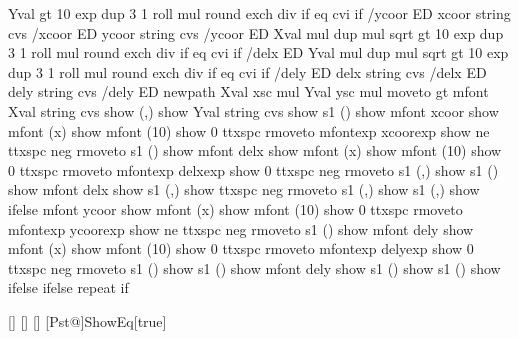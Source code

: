 {{{     Yval \psk@decimals{} gt
     { 10 \psk@decimals\space exp dup 3 1 roll mul round exch div } if
     \psk@decimals{} eq {cvi} if /ycoor ED
     xcoor \psk@valuewidth\space string cvs /xcoor ED
     ycoor \psk@valuewidth\space string cvs /ycoor ED
     \psk@relxerr\space Xval mul dup mul sqrt
     \psk@decimals{} gt
     { 10   \psk@decimals\space exp dup 3 1 roll mul round exch div } if
     \psk@decimals{} eq {cvi} if /delx ED
     \psk@relyerr\space Yval mul dup mul sqrt
     \psk@decimals{} gt
     { 10   \psk@decimals\space exp dup 3 1 roll mul round exch div } if
     \psk@decimals{} eq {cvi} if /dely ED
     delx \psk@valuewidth\space string cvs /delx ED
     dely \psk@valuewidth\space string cvs /dely ED
   \fi
%    
     newpath
     Xval xsc mul %
     Yval ysc mul %
     moveto
     \Pst@Debug{} gt {
     mfont
     Xval \psk@valuewidth\space string cvs show (,) show
     Yval \psk@valuewidth\space string cvs show }
     {s1 (\string{}) show 
     mfont xcoor show
       \ifPst@science
       mfont (x) show
       mfont (10) show
       0 ttxspc rmoveto mfontexp xcoorexp show
       \fi
     \psk@relxerr{} ne
     {  ttxspc neg rmoveto s1 (\string{}) show
       mfont delx show
       mfont (x) show
       mfont (10) show
       0 ttxspc rmoveto mfontexp delxexp show
       0 ttxspc neg rmoveto s1 (,) show
       \else
       s1 (\string{}) show
       mfont delx show
       s1 (,) show
       \fi }
     {  ttxspc neg rmoveto s1 (,) show
       \else
       s1 (,) show
       \fi } ifelse
     mfont ycoor show
       \ifPst@science
       mfont (x) show
       mfont (10) show
       0 ttxspc rmoveto mfontexp ycoorexp show
       \fi
     \psk@relyerr{} ne
     {  ttxspc neg rmoveto s1 (\string{}) show
       mfont dely show
       mfont (x) show
       mfont (10) show
       0 ttxspc rmoveto mfontexp delyexp show
       0 ttxspc neg rmoveto s1 (\string{}) show
       \else
       s1 (\string{}) show
       mfont dely show
       s1 (\string{}) show
       \fi }
       { s1 (\string{}) show } ifelse } ifelse
 } repeat } if }

[{}]{\def\psk@EqPos{#1}}
[{}]{\def\psk@MaPos{#1}}%
[{}]{\def\psk@MaScale{#1}}%
[Pst@]{ShowEq}[true]{}%

